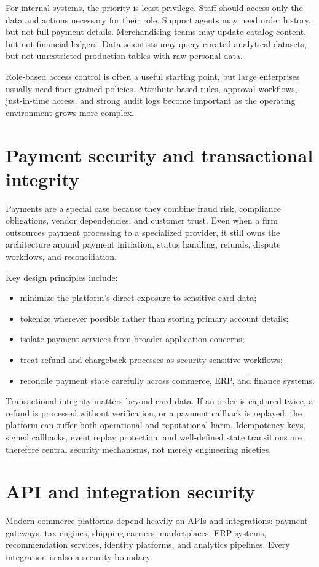 For internal systems, the priority is least privilege. Staff should access only the data and actions necessary for their role. Support agents may need order history, but not full payment details. Merchandising teams may update catalog content, but not financial ledgers. Data scientists may query curated analytical datasets, but not unrestricted production tables with raw personal data.

Role-based access control is often a useful starting point, but large enterprises usually need finer-grained policies. Attribute-based rules, approval workflows, just-in-time access, and strong audit logs become important as the operating environment grows more complex.

\section{Payment security and transactional integrity}
Payments are a special case because they combine fraud risk, compliance obligations, vendor dependencies, and customer trust. Even when a firm outsources payment processing to a specialized provider, it still owns the architecture around payment initiation, status handling, refunds, dispute workflows, and reconciliation.

Key design principles include:
\begin{itemize}
  \item minimize the platform's direct exposure to sensitive card data;
  \item tokenize wherever possible rather than storing primary account details;
  \item isolate payment services from broader application concerns;
  \item treat refund and chargeback processes as security-sensitive workflows;
  \item reconcile payment state carefully across commerce, ERP, and finance systems.
\end{itemize}

Transactional integrity matters beyond card data. If an order is captured twice, a refund is processed without verification, or a payment callback is replayed, the platform can suffer both operational and reputational harm. Idempotency keys, signed callbacks, event replay protection, and well-defined state transitions are therefore central security mechanisms, not merely engineering niceties.

\section{API and integration security}
Modern commerce platforms depend heavily on APIs and integrations: payment gateways, tax engines, shipping carriers, marketplaces, ERP systems, recommendation services, identity platforms, and analytics pipelines. Every integration is also a security boundary.

